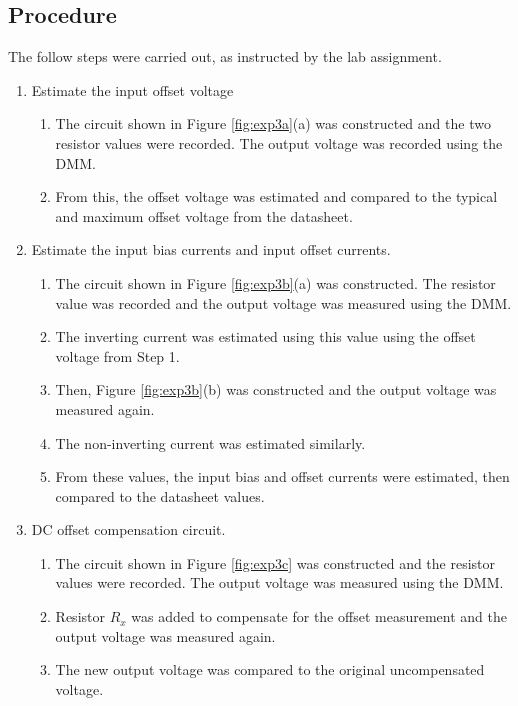 \documentclass{report}
\begin{document}
\subsection{Procedure}
The follow steps were carried out, as instructed by the lab assignment.
\begin{enumerate}
	\item Estimate the input offset voltage 
		\begin{enumerate}
			\item The circuit shown in Figure \ref{fig:exp3a}(a) was constructed and the two resistor values were recorded. The output voltage was recorded using the DMM.
			
			\item From this, the offset voltage was estimated and compared to the typical and maximum offset voltage from the datasheet.
		\end{enumerate}
	
	\item Estimate the input bias currents and input offset currents.
		\begin{enumerate}
			\item The circuit shown in Figure \ref{fig:exp3b}(a) was constructed. The resistor value was recorded and the output voltage was measured using the DMM.
			\item The inverting current was estimated using this value using the offset voltage from Step 1.
			\item Then, Figure \ref{fig:exp3b}(b) was constructed and the output voltage was measured again.
			\item The non-inverting current was estimated similarly.
			\item From these values, the input bias and offset currents were estimated, then compared to the datasheet values.
		\end{enumerate}
	
	\item DC offset compensation circuit. \begin{enumerate}
		\item The circuit shown in Figure \ref{fig:exp3c} was constructed and the resistor values were recorded. The output voltage was measured using the DMM.
		\item Resistor $R_x$ was added to compensate for the offset measurement and the output voltage was measured again.
		\item The new output voltage was compared to the original uncompensated voltage.
	\end{enumerate}
\end{enumerate}
\end{document}
